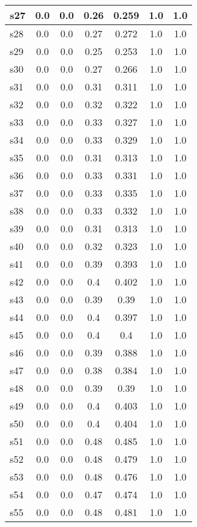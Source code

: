 \documentclass{article}
\begin{document}
\begin{tabular}{|l|c|c|c|c|c|c|}
s27 &0.0 & 0.0 & 0.26 & 0.259 & 1.0 & 1.0\\
\hline
s28 &0.0 & 0.0 & 0.27 & 0.272 & 1.0 & 1.0\\
\hline
s29 &0.0 & 0.0 & 0.25 & 0.253 & 1.0 & 1.0\\
\hline
s30 &0.0 & 0.0 & 0.27 & 0.266 & 1.0 & 1.0\\
\hline
s31 &0.0 & 0.0 & 0.31 & 0.311 & 1.0 & 1.0\\
\hline
s32 &0.0 & 0.0 & 0.32 & 0.322 & 1.0 & 1.0\\
\hline
s33 &0.0 & 0.0 & 0.33 & 0.327 & 1.0 & 1.0\\
\hline
s34 &0.0 & 0.0 & 0.33 & 0.329 & 1.0 & 1.0\\
\hline
s35 &0.0 & 0.0 & 0.31 & 0.313 & 1.0 & 1.0\\
\hline
s36 &0.0 & 0.0 & 0.33 & 0.331 & 1.0 & 1.0\\
\hline
s37 &0.0 & 0.0 & 0.33 & 0.335 & 1.0 & 1.0\\
\hline
s38 &0.0 & 0.0 & 0.33 & 0.332 & 1.0 & 1.0\\
\hline
s39 &0.0 & 0.0 & 0.31 & 0.313 & 1.0 & 1.0\\
\hline
s40 &0.0 & 0.0 & 0.32 & 0.323 & 1.0 & 1.0\\
\hline
s41 &0.0 & 0.0 & 0.39 & 0.393 & 1.0 & 1.0\\
\hline
s42 &0.0 & 0.0 & 0.4 & 0.402 & 1.0 & 1.0\\
\hline
s43 &0.0 & 0.0 & 0.39 & 0.39 & 1.0 & 1.0\\
\hline
s44 &0.0 & 0.0 & 0.4 & 0.397 & 1.0 & 1.0\\
\hline
s45 &0.0 & 0.0 & 0.4 & 0.4 & 1.0 & 1.0\\
\hline
s46 &0.0 & 0.0 & 0.39 & 0.388 & 1.0 & 1.0\\
\hline
s47 &0.0 & 0.0 & 0.38 & 0.384 & 1.0 & 1.0\\
\hline
s48 &0.0 & 0.0 & 0.39 & 0.39 & 1.0 & 1.0\\
\hline
s49 &0.0 & 0.0 & 0.4 & 0.403 & 1.0 & 1.0\\
\hline
s50 &0.0 & 0.0 & 0.4 & 0.404 & 1.0 & 1.0\\
\hline
s51 &0.0 & 0.0 & 0.48 & 0.485 & 1.0 & 1.0\\
\hline
s52 &0.0 & 0.0 & 0.48 & 0.479 & 1.0 & 1.0\\
\hline
s53 &0.0 & 0.0 & 0.48 & 0.476 & 1.0 & 1.0\\
\hline
s54 &0.0 & 0.0 & 0.47 & 0.474 & 1.0 & 1.0\\
\hline
s55 &0.0 & 0.0 & 0.48 & 0.481 & 1.0 & 1.0\\

\end{tabular}
\end{document}
